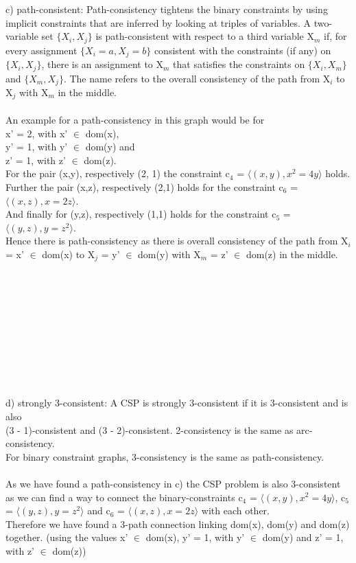 \documentclass[12pt]{article}
\begin{document}
c) path-consistent: Path-consistency tightens the binary constraints by using implicit constraints that are inferred by looking at triples of variables. A two-variable set $\{X_{i} , X_{j} \}$ is path-consistent with respect to a third variable  X$_{m}$ if, for
every assignment $\{X_{i} = a , X_{j} = b \}$ consistent with the constraints (if any) on $\{X_{i} , X_{j} \}$, there is
an assignment to X$_{m}$ that satisfies the constraints on {$\{X_{i} , X_{m} \}$ and $\{X_{m} , X_{j} \}$. The name refers
to the overall consistency of the path from X$_{i}$ to X$_{j}$ with X$_{m}$ in the middle. \\ \\
An example for a path-consistency in this graph would be for\\ x' = 2, with x' $\in$ dom(x),\\ 
y' = 1, with y' $\in$ dom(y) and\\
z' = 1, with z' $\in$ dom(z). \\
For the pair (x,y), respectively (2, 1) the constraint c$_{4}$ = $\langle (x,y), x^{2} = 4y \rangle$ holds.\\ Further the pair (x,z), respectively (2,1) holds for the constraint c$_{6}$ = $\langle (x,z), x = 2z\rangle$.\\ 
And finally for (y,z), respectively (1,1) holds for the constraint c$_{5}$ = $\langle (y,z), y = z^{2} \rangle$.\\
Hence there is path-consistency as there is overall consistency of the path from X$_{i}$ = x' $\in$ dom(x) to X$_{j}$ = y' $\in$ dom(y) with X$_{m}$ = z' $\in$ dom(z) in the middle.
\\ \\ \\ \\ \\ \\ \\ \\ \\ \\ \\
d) strongly 3-consistent: A CSP is strongly 3-consistent if it is 3-consistent and is also\\
(3 - 1)-consistent and (3 - 2)-consistent.
2-consistency is the same as arc-consistency.\\
For binary constraint graphs, 3-consistency is the same as path-consistency.\\ \\
As we have found a path-consistency in c) the CSP problem is also 3-consistent as we can find a way to connect the binary-constraints c$_{4}$ = $\langle (x,y), x^{2} = 4y \rangle$, c$_{5}$ = $\langle (y,z), y = z^{2} \rangle$ and c$_{6}$ = $\langle (x,z), x = 2z\rangle$ with each other.\\
Therefore we have found a 3-path connection linking dom(x), dom(y) and dom(z) together. (using the values x' $\in$ dom(x), y' = 1, with y' $\in$ dom(y) and z' = 1, with z' $\in$ dom(z)) \\


}
\end{document}
